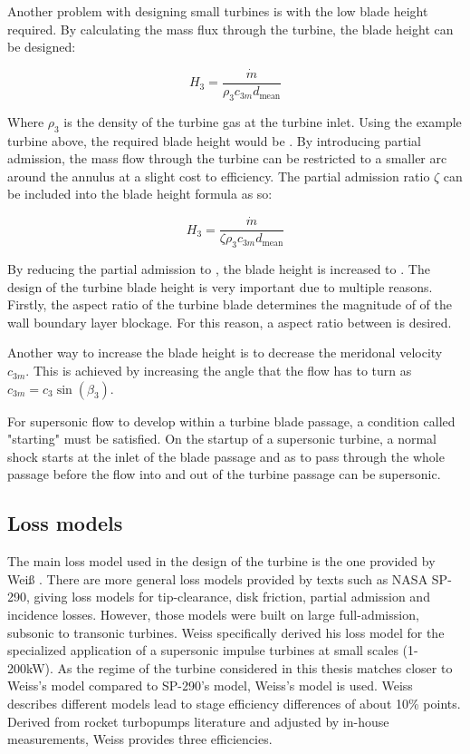 Another problem with designing small turbines is with the low blade height required. By calculating the mass flux through the turbine, the blade height can be designed:

\begin{equation}
    H_3 = \frac{\dot{m}}{\rho_3 c_{3m} d_{\textrm{mean}}}
    \label{eq:turbine_blade_height_full_admission}
\end{equation}

Where $\rho_3$ is the density of the turbine gas at the turbine inlet. Using the example turbine above, the required blade height would be . By introducing partial admission, the mass flow through the turbine can be restricted to a smaller arc around the annulus at a slight cost to efficiency. The partial admission ratio $\zeta$ can be included into the blade height formula as so:

\begin{equation}
    H_3 = \frac{\dot{m}}{\zeta \rho_3 c_{3m} d_{\textrm{mean}}}
    \label{eq:turbine_blade_height}
\end{equation}

By reducing the partial admission to , the blade height is increased to . The design of the turbine blade height is very important due to multiple reasons. Firstly, the aspect ratio of the turbine blade determines the magnitude of of the wall boundary layer blockage. For this reason, a aspect ratio between  is desired.

Another way to increase the blade height is to decrease the meridonal velocity $c_{3m}$. This is achieved by increasing the angle that the flow has to turn as $c_{3m}=c_3\sin(\beta_3)$. 

For supersonic flow to develop within a turbine blade passage, a condition called "starting" must be satisfied. On the startup of a supersonic turbine, a normal shock starts at the inlet of the blade passage and as to pass through the whole passage before the flow into and out of the turbine passage can be supersonic. 


\subsection{Loss models}
\label{subsec:weissloss}

The main loss model used in the design of the turbine is the one provided by Weiß \cite{weiss}. There are more general loss models provided by texts such as NASA SP-290, giving loss models for tip-clearance, disk friction, partial admission and incidence losses. However, those models were built on large full-admission, subsonic to transonic turbines. Weiss specifically derived his loss model for the specialized application of a supersonic impulse turbines at small scales (1-200kW). As the regime of the turbine considered in this thesis matches closer to Weiss's model compared to SP-290's model, Weiss's model is used. Weiss describes different models lead to stage efficiency differences of about 10\% points. Derived from rocket turbopumps literature and adjusted by in-house measurements, Weiss provides three efficiencies.


